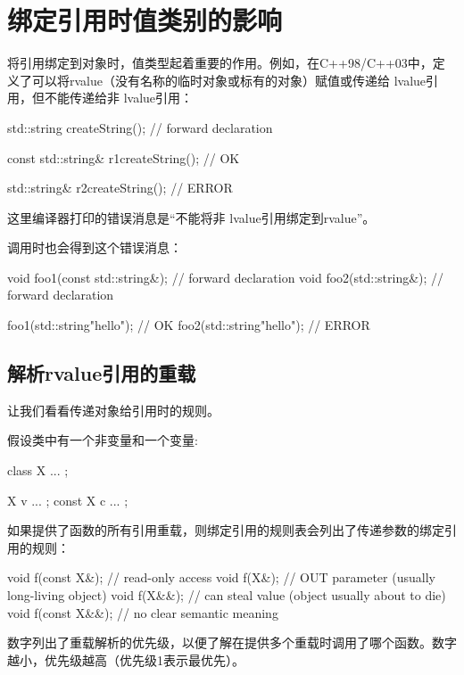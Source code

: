 \section{绑定引用时值类别的影响}
将引用绑定到对象时，值类型起着重要的作用。例如，在C++98/C++03中，定义了可以将rvalue（没有名称的临时对象或标有的对象）赋值或传递给 lvalue引用，但不能传递给非 lvalue引用：

\begin{cppcode}
std::string createString(); // forward declaration

const std::string& r1{createString()}; // OK

std::string& r2{createString()}; // ERROR
\end{cppcode}

这里编译器打印的错误消息是“不能将非 lvalue引用绑定到rvalue”。

调用时也会得到这个错误消息：

\begin{cppcode}
void foo1(const std::string&); // forward declaration
void foo2(std::string&); // forward declaration

foo1(std::string{"hello"}); // OK
foo2(std::string{"hello"}); // ERROR
\end{cppcode}

\subsection{解析rvalue引用的重载}

让我们看看传递对象给引用时的规则。

假设类中有一个非变量和一个变量:

\begin{cppcode}
class X {
	...
};

X v{ ... };
const X c{ ... };
\end{cppcode}

如果提供了函数的所有引用重载，则绑定引用的规则表会列出了传递参数的绑定引用的规则：

\begin{cppcode}
void f(const X&); // read-only access
void f(X&); // OUT parameter (usually long-living object)
void f(X&&); // can steal value (object usually about to die)
void f(const X&&); // no clear semantic meaning
\end{cppcode}

数字列出了重载解析的优先级，以便了解在提供多个重载时调用了哪个函数。数字越小，优先级越高（优先级1表示最优先）。

